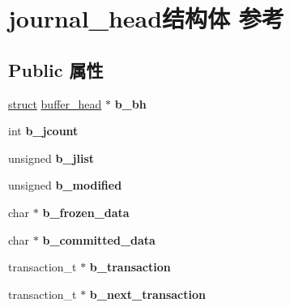 \hypertarget{structjournal__head}{}\section{journal\+\_\+head结构体 参考}
\label{structjournal__head}
\subsection*{Public 属性}
\begin{DoxyCompactItemize}
\item 
\mbox{\label{structjournal__head_aab4f77e4786b6ed4a6355bcd8ed82909}} 
\hyperlink{interfacestruct}{struct} \hyperlink{structbuffer__head}{buffer\+\_\+head} $\ast$ {\bfseries b\+\_\+bh}
\item 
\mbox{\label{structjournal__head_abc3912c58b40bc32b8da9090e7ae1d14}} 
int {\bfseries b\+\_\+jcount}
\item 
\mbox{\label{structjournal__head_ab19bb06d829d43a1a53e7f1f5f8c7f35}} 
unsigned {\bfseries b\+\_\+jlist}
\item 
\mbox{\label{structjournal__head_a7eb31268f7c5dee1964c6043ba9d03bf}} 
unsigned {\bfseries b\+\_\+modified}
\item 
\mbox{\label{structjournal__head_a05600684f7eb632e361d7ec79ef2ca7f}} 
char $\ast$ {\bfseries b\+\_\+frozen\+\_\+data}
\item 
\mbox{\label{structjournal__head_ae0f9a1d7f9d8bc18867a7e50392ed523}} 
char $\ast$ {\bfseries b\+\_\+committed\+\_\+data}
\item 
\mbox{\label{structjournal__head_afff9f3905fc6c0827bb034b43d9ff477}} 
transaction\+\_\+t $\ast$ {\bfseries b\+\_\+transaction}
\item 
\mbox{\label{structjournal__head_a668ad5aebd78170db124a16318df7a36}} 
transaction\+\_\+t $\ast$ {\bfseries b\+\_\+next\+\_\+transaction}
\item 
\mbox{\label{structjournal__head_afe956c603fc43ad689a15546ca99c30c}} 

\end{DoxyCompactItemize}
